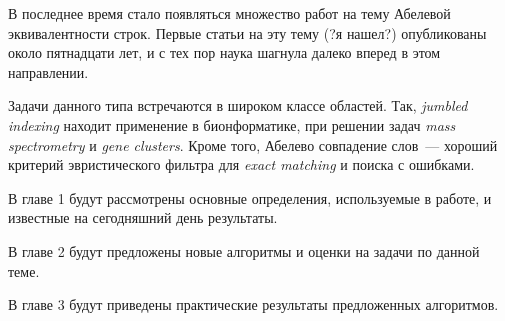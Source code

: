 
В последнее время стало появляться множество работ на тему Абелевой эквивалентности строк. Первые статьи на эту тему (?я нашел?) опубликованы около пятнадцати лет, и с тех пор наука шагнула далеко вперед в этом направлении.

Задачи данного типа встречаются в широком классе областей. Так, \textit{jumbled indexing} находит применение в бионформатике, при решении задач \textit{mass spectrometry} и \textit{gene clusters}. Кроме того, Абелево совпадение слов~--- хороший критерий эвристического фильтра для \textit{exact matching} и поиска с ошибками.

В главе 1 будут рассмотрены основные определения, используемые в работе, и известные на сегодняшний день результаты.

В главе 2 будут предложены новые алгоритмы и оценки на задачи по данной теме.

В главе 3 будут приведены практические результаты предложенных алгоритмов.
